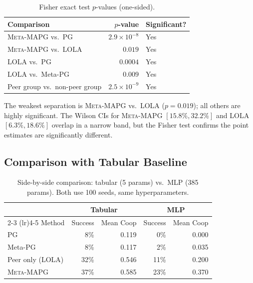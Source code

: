 \documentclass[11pt,a4paper]{article}
\newcommand{\MAPG}{\textsc{Meta-MAPG}}
\begin{document}
\begin{table}[H]
\centering
\caption{Fisher exact test $p$-values (one-sided).}
\label{tab:fisher}
\begin{tabular}{l r l}
\toprule
Comparison & $p$-value & Significant? \\
\midrule
\MAPG{} vs.\ PG & $2.9 \times 10^{-8}$ & Yes \\
\MAPG{} vs.\ LOLA & $0.019$ & Yes \\
LOLA vs.\ PG & $0.0004$ & Yes \\
LOLA vs.\ Meta-PG & $0.009$ & Yes \\
Peer group vs.\ non-peer group & $2.5 \times 10^{-9}$ & Yes \\
\bottomrule
\end{tabular}
\end{table}

The weakest separation is \MAPG{} vs.\ LOLA ($p = 0.019$); all others are highly significant. The Wilson CIs for \MAPG{} $[15.8\%, 32.2\%]$ and LOLA $[6.3\%, 18.6\%]$ overlap in a narrow band, but the Fisher test confirms the point estimates are significantly different.

\subsection{Comparison with Tabular Baseline}

\begin{table}[H]
\centering
\caption{Side-by-side comparison: tabular (5 params) vs.\ MLP (385 params). Both use 100 seeds, same hyperparameters.}
\label{tab:comparison}
\begin{tabular}{l r r r r}
\toprule
& \multicolumn{2}{c}{Tabular} & \multicolumn{2}{c}{MLP} \\
\cmidrule(lr){2-3} \cmidrule(lr){4-5}
Method & Success & Mean Coop & Success & Mean Coop \\
\midrule
PG & 8\% & 0.119 & 0\% & 0.000 \\
Meta-PG & 8\% & 0.117 & 2\% & 0.035 \\
Peer only (LOLA) & 32\% & 0.546 & 11\% & 0.200 \\
\MAPG{} & 37\% & 0.585 & 23\% & 0.370 \\
\bottomrule
\end{tabular}
\end{table}
\end{document}
